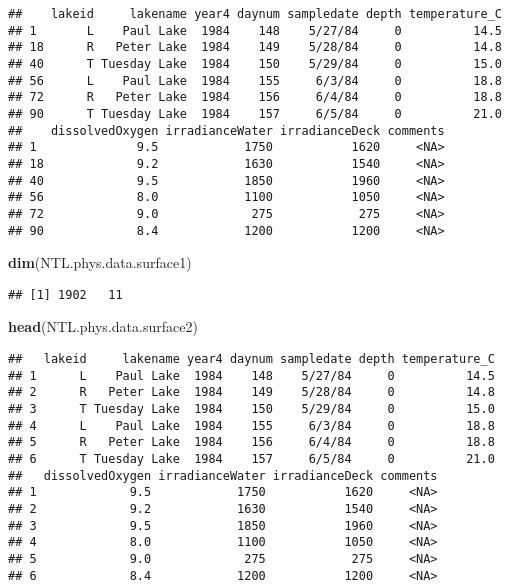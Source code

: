 \documentclass[]{article}
\newenvironment{Shaded}{\begin{snugshade}}{\end{snugshade}}
\newcommand{\KeywordTok}[1]{\textcolor[rgb]{0.13,0.29,0.53}{\textbf{#1}}}
\newcommand{\NormalTok}[1]{#1}
\begin{document}
\begin{verbatim}
##    lakeid     lakename year4 daynum sampledate depth temperature_C
## 1       L    Paul Lake  1984    148    5/27/84     0          14.5
## 18      R   Peter Lake  1984    149    5/28/84     0          14.8
## 40      T Tuesday Lake  1984    150    5/29/84     0          15.0
## 56      L    Paul Lake  1984    155     6/3/84     0          18.8
## 72      R   Peter Lake  1984    156     6/4/84     0          18.8
## 90      T Tuesday Lake  1984    157     6/5/84     0          21.0
##    dissolvedOxygen irradianceWater irradianceDeck comments
## 1              9.5            1750           1620     <NA>
## 18             9.2            1630           1540     <NA>
## 40             9.5            1850           1960     <NA>
## 56             8.0            1100           1050     <NA>
## 72             9.0             275            275     <NA>
## 90             8.4            1200           1200     <NA>
\end{verbatim}

\begin{Shaded}
\begin{Highlighting}[]
\KeywordTok{dim}\NormalTok{(NTL.phys.data.surface1)}
\end{Highlighting}
\end{Shaded}

\begin{verbatim}
## [1] 1902   11
\end{verbatim}

\begin{Shaded}
\begin{Highlighting}[]
\KeywordTok{head}\NormalTok{(NTL.phys.data.surface2)}
\end{Highlighting}
\end{Shaded}

\begin{verbatim}
##   lakeid     lakename year4 daynum sampledate depth temperature_C
## 1      L    Paul Lake  1984    148    5/27/84     0          14.5
## 2      R   Peter Lake  1984    149    5/28/84     0          14.8
## 3      T Tuesday Lake  1984    150    5/29/84     0          15.0
## 4      L    Paul Lake  1984    155     6/3/84     0          18.8
## 5      R   Peter Lake  1984    156     6/4/84     0          18.8
## 6      T Tuesday Lake  1984    157     6/5/84     0          21.0
##   dissolvedOxygen irradianceWater irradianceDeck comments
## 1             9.5            1750           1620     <NA>
## 2             9.2            1630           1540     <NA>
## 3             9.5            1850           1960     <NA>
## 4             8.0            1100           1050     <NA>
## 5             9.0             275            275     <NA>
## 6             8.4            1200           1200     <NA>
\end{verbatim}
\end{document}
